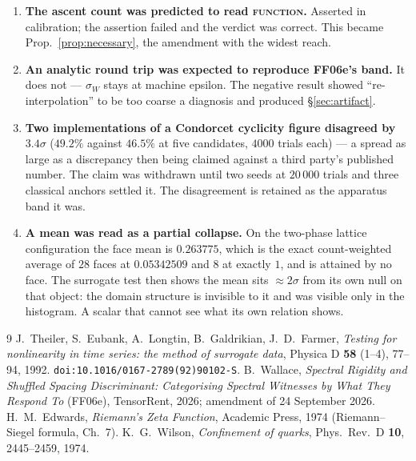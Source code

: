 \documentclass[11pt]{article}
\theoremstyle{remark}
\newcommand{\tier}[1]{\textsc{#1}}
\begin{document}
\begin{enumerate}[leftmargin=2em,itemsep=3pt]
\item \textbf{The ascent count was predicted to read \tier{function}.} Asserted in
calibration; the assertion failed and the verdict was correct. This became
Prop.~\ref{prop:necessary}, the amendment with the widest reach.

\item \textbf{An analytic round trip was expected to reproduce FF06e's band.} It does not
--- $\sigma_W$ stays at machine epsilon. The negative result showed
``re-interpolation'' to be too coarse a diagnosis and produced \S\ref{sec:artifact}.

\item \textbf{Two implementations of a Condorcet cyclicity figure disagreed by
$3.4\sigma$} ($49.2\%$ against $46.5\%$ at five candidates, $4000$ trials each) --- a
spread as large as a discrepancy then being claimed against a third party's published
number. The claim was withdrawn until two seeds at $20\,000$ trials and three classical
anchors settled it. The disagreement is retained as the apparatus band it was.

\item \textbf{A mean was read as a partial collapse.} On the two-phase lattice
configuration the face mean is $0.263775$, which is the exact count-weighted average of
$28$ faces at $0.05342509$ and $8$ at exactly $1$, and is attained by no face. The
surrogate test then shows the mean sits $\approx2\sigma$ from its own null on that
object: the domain structure is invisible to it and was visible only in the histogram.
A scalar that cannot see what its own relation shows.
\end{enumerate}

\begin{thebibliography}{9}
 J.~Theiler, S.~Eubank, A.~Longtin, B.~Galdrikian, J.~D.~Farmer,
  \emph{Testing for nonlinearity in time series: the method of surrogate data},
  Physica D \textbf{58} (1--4), 77--94, 1992. \texttt{doi:10.1016/0167-2789(92)90102-S}.
 B.~Wallace, \emph{Spectral Rigidity and Shuffled Spacing Discriminant:
  Categorising Spectral Witnesses by What They Respond To} (FF06e), TensorRent, 2026;
  amendment of 24 September 2026.
 H.~M.~Edwards, \emph{Riemann's Zeta Function}, Academic Press, 1974
  (Riemann--Siegel formula, Ch.~7).
 K.~G.~Wilson, \emph{Confinement of quarks},
  Phys.\ Rev.\ D \textbf{10}, 2445--2459, 1974.
\end{thebibliography}
\end{document}
